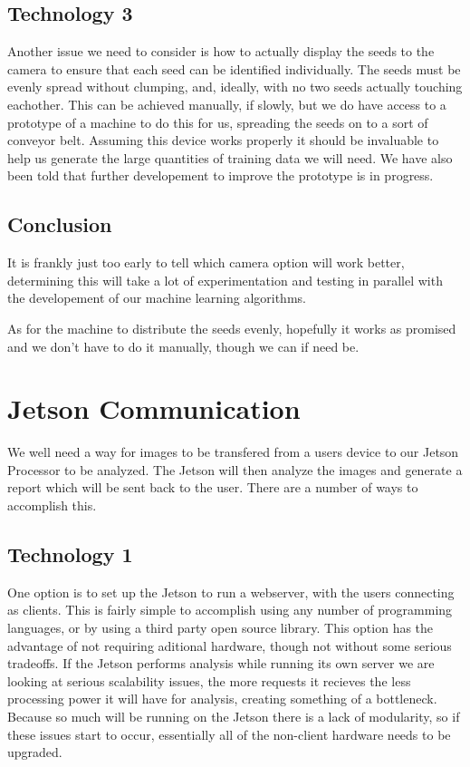 \documentclass[onecolumn, draftclsnofoot,10pt, compsoc]{IEEEtran}
\begin{document}
\subsection{Technology 3}
Another issue we need to consider is how to actually display the seeds to the camera to ensure that each seed can be identified individually.
The seeds must be evenly spread without clumping, and, ideally, with no two seeds actually touching eachother.
This can be achieved manually, if slowly, but we do have access to a prototype of a machine to do this for us, spreading the seeds on to a sort of conveyor belt.
Assuming this device works properly it should be invaluable to help us generate the large quantities of training data we will need.
We have also been told that further developement to improve the prototype is in progress.

\subsection{Conclusion}
It is frankly just too early to tell which camera option will work better, determining this will take a lot of experimentation and testing in parallel with the developement of our machine learning algorithms.

As for the machine to distribute the seeds evenly, hopefully it works as promised and we don't have to do it manually, though we can if need be.

\section{Jetson Communication}
We well need a way for images to be transfered from a users device to our Jetson Processor to be analyzed. The Jetson will then analyze the images and generate a report which will be sent back to the user. There are a number of ways to accomplish this.

\subsection{Technology 1}
One option is to set up the Jetson to run a webserver, with the users connecting as clients.
This is fairly simple to accomplish using any number of programming languages, or by using a third party open source library.
This option has the advantage of not requiring aditional hardware, though not without some serious tradeoffs.
If the Jetson performs analysis while running its own server we are looking at serious scalability issues, the more requests it recieves the less processing power it will have for analysis, creating something of a bottleneck.
Because so much will be running on the Jetson there is a lack of modularity, so if these issues start to occur, essentially all of the non-client hardware needs to be upgraded.
\end{document}
